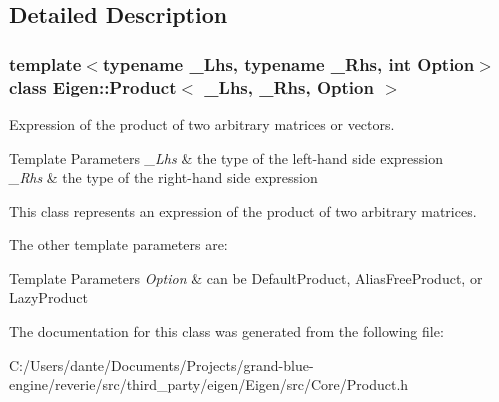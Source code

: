 \subsection{Detailed Description}
\subsubsection*{template$<$typename \+\_\+\+Lhs, typename \+\_\+\+Rhs, int Option$>$\newline
class Eigen\+::\+Product$<$ \+\_\+\+Lhs, \+\_\+\+Rhs, Option $>$}

Expression of the product of two arbitrary matrices or vectors. 


\begin{DoxyTemplParams}{Template Parameters}
{\em \+\_\+\+Lhs} & the type of the left-\/hand side expression \\
\hline
{\em \+\_\+\+Rhs} & the type of the right-\/hand side expression\\
\hline
\end{DoxyTemplParams}
This class represents an expression of the product of two arbitrary matrices.

The other template parameters are\+: 
\begin{DoxyTemplParams}{Template Parameters}
{\em Option} & can be Default\+Product, Alias\+Free\+Product, or Lazy\+Product \\
\hline
\end{DoxyTemplParams}


The documentation for this class was generated from the following file\+:\begin{DoxyCompactItemize}
\item 
C\+:/\+Users/dante/\+Documents/\+Projects/grand-\/blue-\/engine/reverie/src/third\+\_\+party/eigen/\+Eigen/src/\+Core/Product.\+h\end{DoxyCompactItemize}
